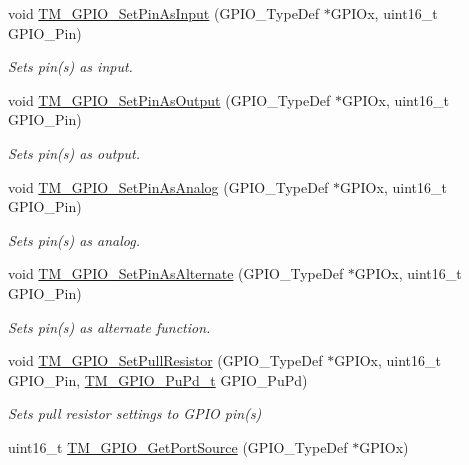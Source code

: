 \begin{DoxyCompactItemize}
void \hyperlink{group___t_m___g_p_i_o___functions_ga9c5ca4f894b1f46d413d2bfc692fcf43}{T\+M\+\_\+\+G\+P\+I\+O\+\_\+\+Set\+Pin\+As\+Input} (G\+P\+I\+O\+\_\+\+Type\+Def $\ast$G\+P\+I\+Ox, uint16\+\_\+t G\+P\+I\+O\+\_\+\+Pin)
\begin{DoxyCompactList}\small\item\em Sets pin(s) as input. \end{DoxyCompactList}\item 
void \hyperlink{group___t_m___g_p_i_o___functions_gabfa399cb17386714bd9c395a81b43035}{T\+M\+\_\+\+G\+P\+I\+O\+\_\+\+Set\+Pin\+As\+Output} (G\+P\+I\+O\+\_\+\+Type\+Def $\ast$G\+P\+I\+Ox, uint16\+\_\+t G\+P\+I\+O\+\_\+\+Pin)
\begin{DoxyCompactList}\small\item\em Sets pin(s) as output. \end{DoxyCompactList}\item 
void \hyperlink{group___t_m___g_p_i_o___functions_gaeaa3015995a3d1947d63a63240b38433}{T\+M\+\_\+\+G\+P\+I\+O\+\_\+\+Set\+Pin\+As\+Analog} (G\+P\+I\+O\+\_\+\+Type\+Def $\ast$G\+P\+I\+Ox, uint16\+\_\+t G\+P\+I\+O\+\_\+\+Pin)
\begin{DoxyCompactList}\small\item\em Sets pin(s) as analog. \end{DoxyCompactList}\item 
void \hyperlink{group___t_m___g_p_i_o___functions_ga7828700c54f2449fed2afb0a84c1698d}{T\+M\+\_\+\+G\+P\+I\+O\+\_\+\+Set\+Pin\+As\+Alternate} (G\+P\+I\+O\+\_\+\+Type\+Def $\ast$G\+P\+I\+Ox, uint16\+\_\+t G\+P\+I\+O\+\_\+\+Pin)
\begin{DoxyCompactList}\small\item\em Sets pin(s) as alternate function. \end{DoxyCompactList}\item 
void \hyperlink{group___t_m___g_p_i_o___functions_ga2c9473d78b1c2f5031d914a38bab036a}{T\+M\+\_\+\+G\+P\+I\+O\+\_\+\+Set\+Pull\+Resistor} (G\+P\+I\+O\+\_\+\+Type\+Def $\ast$G\+P\+I\+Ox, uint16\+\_\+t G\+P\+I\+O\+\_\+\+Pin, \hyperlink{group___t_m___g_p_i_o___typedefs_ga50ddb0da56d8a388dee368c55e968602}{T\+M\+\_\+\+G\+P\+I\+O\+\_\+\+Pu\+Pd\+\_\+t} G\+P\+I\+O\+\_\+\+Pu\+Pd)
\begin{DoxyCompactList}\small\item\em Sets pull resistor settings to G\+P\+IO pin(s) \end{DoxyCompactList}\item 
uint16\+\_\+t \hyperlink{group___t_m___g_p_i_o___functions_gaa5a2f30f33cc19408daeb5db3b7cb59c}{T\+M\+\_\+\+G\+P\+I\+O\+\_\+\+Get\+Port\+Source} (G\+P\+I\+O\+\_\+\+Type\+Def $\ast$G\+P\+I\+Ox)

\end{DoxyCompactItemize}
